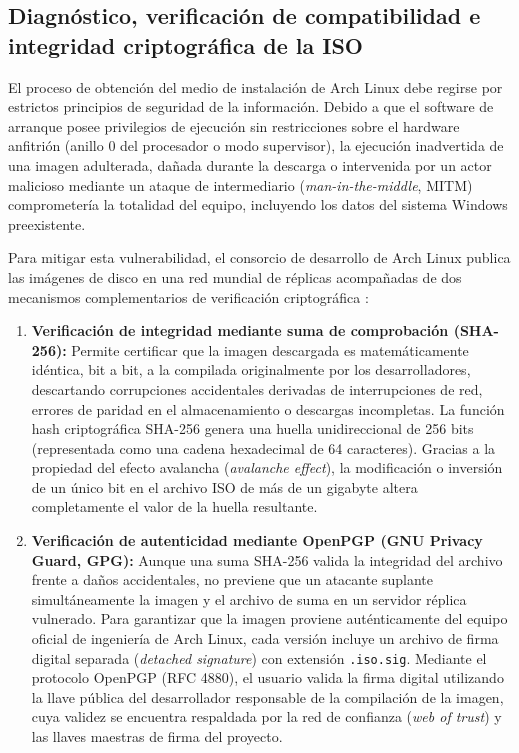 \documentclass[12pt]{article}
\begin{document}
\subsection{Diagnóstico, verificación de compatibilidad e integridad criptográfica de la ISO}
\label{sec:integridadCriptografica}

El proceso de obtención del medio de instalación de Arch Linux debe regirse por estrictos principios de seguridad de la información. Debido a que el software de arranque posee privilegios de ejecución sin restricciones sobre el hardware anfitrión (anillo 0 del procesador o modo supervisor), la ejecución inadvertida de una imagen adulterada, dañada durante la descarga o intervenida por un actor malicioso mediante un ataque de intermediario (\textit{man-in-the-middle}, MITM) comprometería la totalidad del equipo, incluyendo los datos del sistema Windows preexistente.

Para mitigar esta vulnerabilidad, el consorcio de desarrollo de Arch Linux publica las imágenes de disco en una red mundial de réplicas acompañadas de dos mecanismos complementarios de verificación criptográfica \parencite{arch2024download}:
\begin{enumerate}[noitemsep, topsep=2pt]
    \item \textbf{Verificación de integridad mediante suma de comprobación (SHA-256):} Permite certificar que la imagen descargada es matemáticamente idéntica, bit a bit, a la compilada originalmente por los desarrolladores, descartando corrupciones accidentales derivadas de interrupciones de red, errores de paridad en el almacenamiento o descargas incompletas. La función hash criptográfica SHA-256 genera una huella unidireccional de 256 bits (representada como una cadena hexadecimal de 64 caracteres). Gracias a la propiedad del efecto avalancha (\textit{avalanche effect}), la modificación o inversión de un único bit en el archivo ISO de más de un gigabyte altera completamente el valor de la huella resultante.
    \item \textbf{Verificación de autenticidad mediante OpenPGP (GNU Privacy Guard, GPG):} Aunque una suma SHA-256 valida la integridad del archivo frente a daños accidentales, no previene que un atacante suplante simultáneamente la imagen y el archivo de suma en un servidor réplica vulnerado. Para garantizar que la imagen proviene auténticamente del equipo oficial de ingeniería de Arch Linux, cada versión incluye un archivo de firma digital separada (\textit{detached signature}) con extensión \texttt{.iso.sig}. Mediante el protocolo OpenPGP (RFC 4880), el usuario valida la firma digital utilizando la llave pública del desarrollador responsable de la compilación de la imagen, cuya validez se encuentra respaldada por la red de confianza (\textit{web of trust}) y las llaves maestras de firma del proyecto.
\end{enumerate}
\end{document}
